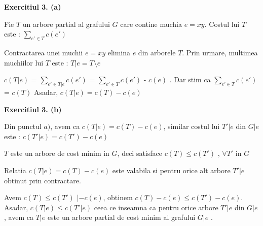 \documentclass{article}
\begin{document}
 

\textbf{Exercitiul 3. (a) }

Fie $T$ un arbore partial al grafului $G$ care contine muchia $e=xy$. Costul lui $T$ este : $\sum_{e' \in T} c(e')$

Contractarea unei muchii $e=xy$ elimina $e$ din arborele $T$. Prin urmare, multimea muchiilor lui $T$ este : $T|e=T\setminus{e}$

$c(T|e)$ = $\sum_{e' \in T|e} c(e')$ = $\sum_{e' \in T} c(e')$ - $c(e)$ . Dar stim ca $\sum_{e' \in T} c(e')$ = $c(T)$ 
Asadar, $c(T|e)=c(T)-c(e)$

\textbf{Exercitiul 3. (b) }

Din punctul $a)$, avem ca $c(T|e) = c(T) - c(e)$, similar costul lui $T'|e$ din $G|e$ este : $c(T'|e) = c(T') - c(e)$

$T$ este un arbore de cost minim in $G$, deci satisface $c(T)\leq c(T')$ , $\forall T'$ in $G$

Relatia $c(T|e) = c(T) - c(e)$ este valabila si pentru orice alt arbore $T'|e$ obtinut prin contractare.

Avem $c(T)\leq c(T')$ $| -c(e)$, obtinem $c(T) - c(e) \leq c(T') - c(e)$. Asadar, $c(T|e)\leq c(T'|e)$ ceea ce inseamna ca pentru orice arbore $T'|e$ din $G|e$, avem ca $T|e$ este un arbore partial de cost minim al grafului $G|e$ .
\end{document}
